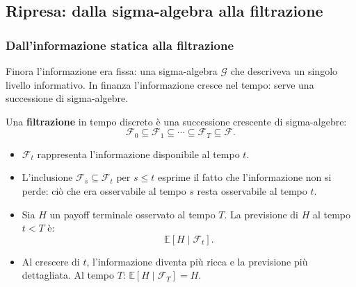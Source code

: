 \documentclass[handout]{beamer}%
\newenvironment{stepitemize}{\begin{itemize}[<+->]}{\end{itemize} }
\providecommand{\E}{\mathbb{E}}
\providecommand{\G}{\mathcal{G}}
\providecommand{\1}{\mathbf{1}}
\providecommand{\QTR}[2]{\csname #1\endcsname{#2}}
\begin{document}
\subsection{Ripresa: dalla sigma-algebra alla filtrazione}%

\begin{frame}%
%

\frametitle{Dall'informazione statica alla filtrazione}%
%

%


Finora l'informazione era fissa: una sigma-algebra $\G$ che descriveva un
singolo livello informativo.
\textcolor{light-blue}{In finanza l'informazione cresce nel tempo:
serve una successione di sigma-algebre.}

\medskip

Una \textbf{filtrazione} in tempo discreto \`{e} una successione crescente di
sigma-algebre:
\[
\mathcal{F}_{0} \subseteq\mathcal{F}_{1} \subseteq\cdots\subseteq
\mathcal{F}_{T} \subseteq\mathcal{F}.
\]


\begin{stepitemize}
\item $\mathcal{F}_{t}$ rappresenta l'informazione disponibile al tempo $t$.

\item L'inclusione $\mathcal{F}_{s} \subseteq\mathcal{F}_{t}$ per $s \leq t$
esprime il fatto che l'informazione non si perde: ci\`{o} che era osservabile
al tempo $s$ resta osservabile al tempo $t$.

\item Sia $H$ un payoff terminale osservato al tempo $T$. La previsione di $H$
al tempo $t < T$ \`{e}:
\[
\E[H\mid\mathcal{F}_t].
\]


\item Al crescere di $t$, l'informazione diventa pi\`{u} ricca e la previsione
pi\`{u} dettagliata. Al tempo $T$: $\E[H\mid\mathcal{F}_T] = H$.
\end{stepitemize}%

\transboxout
\end{frame}%
\end{document}
